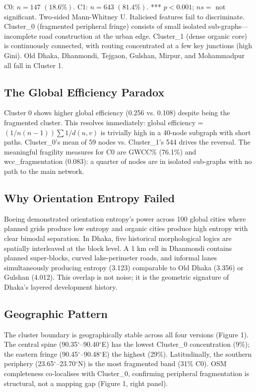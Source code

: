 \documentclass[sigconf, nonacm]{acmart}
\begin{document}
C0: $n=147$ $(18.6\%)$. C1: $n=643$ $(81.4\%)$. *** $p<0.001$; $ns=$ not significant. Two-sided Mann-Whitney U. Italicised features fail to discriminate. Cluster\_0 (fragmented peripheral fringe) consists of small isolated sub-graphs---incomplete road construction at the urban edge. Cluster\_1 (dense organic core) is continuously connected, with routing concentrated at a few key junctions (high Gini). Old Dhaka, Dhanmondi, Tejgaon, Gulshan, Mirpur, and Mohammadpur all fall in Cluster 1.

\subsection{The Global Efficiency Paradox}

Cluster 0 shows higher global efficiency (0.256 vs. 0.108) despite being the fragmented cluster. This resolves immediately: global efficiency = $(1/n(n-1))\sum 1/d(u, v)$ is trivially high in a 40-node subgraph with short paths. Cluster\_0's mean of 59 nodes vs. Cluster\_1's 544 drives the reversal. The meaningful fragility measures for C0 are GWCC\% (76.1\%) and wcc\_fragmentation (0.083): a quarter of nodes are in isolated sub-graphs with no path to the main network.


\subsection{Why Orientation Entropy Failed}

Boeing \cite{boeing2021} demonstrated orientation entropy's power across 100 global cities where planned grids produce low entropy and organic cities produce high entropy with clear bimodal separation. In Dhaka, five historical morphological logics are spatially interleaved at the block level. A 1 km cell in Dhanmondi contains planned super-blocks, curved lake-perimeter roads, and informal lanes simultaneously producing entropy (3.123) comparable to Old Dhaka (3.356) or Gulshan (4.012). This overlap is not noise; it is the geometric signature of Dhaka's layered development history.
\subsection{Geographic Pattern}

The cluster boundary is geographically stable across all four versions (Figure 1). The central spine (90.35$^\circ$--90.40$^\circ$E) has the lowest Cluster\_0 concentration (9\%); the eastern fringe (90.45$^\circ$--90.48$^\circ$E) the highest (29\%). Latitudinally, the southern periphery (23.65$^\circ$--23.70$^\circ$N) is the most fragmented band (31\% C0). OSM completeness co-localises with Cluster\_0, confirming peripheral fragmentation is structural, not a mapping gap (Figure 1, right panel).
\end{document}
